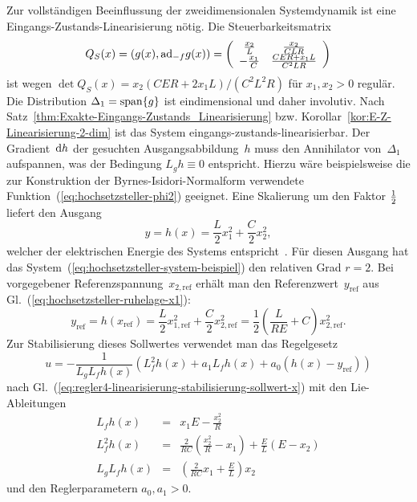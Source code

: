 Zur vollständigen Beeinflussung der zweidimensionalen Systemdynamik
ist eine Eingangs-Zustands-Linearisierung nötig. Die Steuerbarkeitsmatrix
\[
Q_{S}(x)=\left(g(x),{\operatorname{ad}}_{-f}g(x)\right)=\left(\begin{array}{cc}
\frac{x_{2}}{L} & \frac{x_{2}}{CLR}\\
-\frac{x_{1}}{C} & \frac{CER+x_{1}L}{C^{2}LR}
\end{array}\right)
\]
ist wegen $\det Q_{S}(x)=x_{2}(CER+2x_{1}L)/(C^{2}L^{2}R)$ für $x_{1},x_{2}>0$
regulär. Die Distribution $\Delta_{1}={\operatorname{span}}\{g\}$ ist eindimensional
und daher involutiv. Nach Satz~\ref{thm:Exakte-Eingangs-Zustands_Linearisierung}
bzw. Korollar~\ref{kor:E-Z-Linearisierung-2-dim} ist das System
eingangs-zustands-linearisierbar. Der Gradient~${\mathrm{d}} h$ der gesuchten
Ausgangsabbildung~$h$ muss den Annihilator von~$\Delta_{1}$ aufspannen,
was der Bedingung $L_{g}h\equiv0$ entspricht. Hierzu wäre beispielsweise
die zur Konstruktion der Byrnes-Isidori-Normalform verwendete Funktion~(\ref{eq:hochsetzsteller-phi2})
geeignet. Eine Skalierung um den Faktor $\tfrac{1}{2}$ liefert den Ausgang
\begin{equation}
y=h(x)=\frac{L}{2}x_{1}^{2}+\frac{C}{2}x_{2}^{2},\label{eq:hochsetzsteller-ausgang-energie}
\end{equation}
welcher der elektrischen Energie des Systems entspricht~\cite{escobar1999converter,sira-ramirez2002converter}.
Für diesen Ausgang hat das System~(\ref{eq:hochsetzsteller-system-beispiel})
den relativen Grad $r=2$. Bei vorgegebener Referenzspannung~$x_{2,\text{ref}}$
erhält man den Referenzwert~$y_{\text{ref}}$ aus Gl.~(\ref{eq:hochsetzsteller-ruhelage-x1}):
\[
y_{\text{ref}}=h(x_{\text{ref}})=\frac{L}{2}x_{1,\text{ref}}^{2}+\frac{C}{2}x_{2,\text{ref}}^{2}=\frac{1}{2}\left(\frac{L}{RE}+C\right)x_{2,\text{ref}}^{2}.
\]
Zur Stabilisierung dieses Sollwertes verwendet man das Regelgesetz
\begin{equation}
u=-\frac{1}{L_{g}L_{f}h(x)}\left(L_{f}^{2}h(x)+a_{1}L_{f}h(x)+a_{0}(h(x)-y_{\text{ref}})\right)\label{eq:hochsetzsteller-E-Z-Lin-u}
\end{equation}
nach Gl.~(\ref{eq:regler4-linearisierung-stabilisierung-sollwert-x})
mit den Lie-Ableitungen 
\begin{eqnarray}
L_{f}h(x) & = & x_{1}E-\frac{x_{2}^{2}}{R}\nonumber \\
L_{f}^{2}h(x) & = & \frac{2}{RC}\left(\frac{x_{2}^{2}}{R}-x_{1}\right)+\frac{E}{L}\left(E-x_{2}\right)\label{eq:Hochsetzsteller-Lie-Ableitungen-Energie}\\
L_{g}L_{f}h(x) & = & \left(\frac{2}{RC}x_{1}+\frac{E}{L}\right)x_{2}\nonumber 
\end{eqnarray}
und den Reglerparametern $a_{0},a_{1}>0$.

